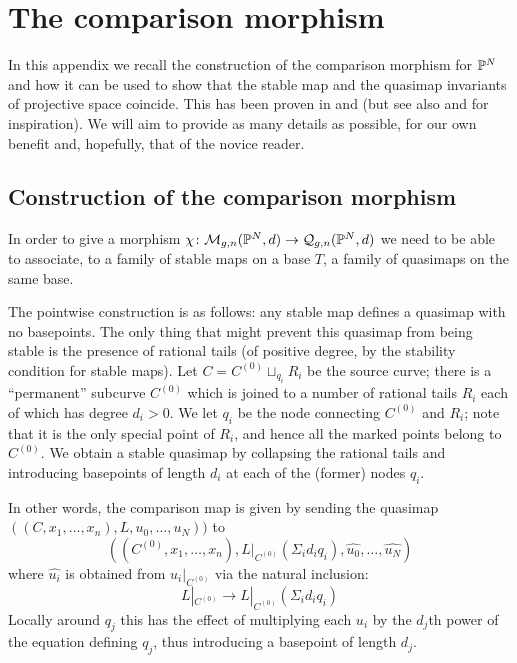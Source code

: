 \section{The comparison morphism} \label{Section comparison morphism}
In this appendix we recall the construction of the comparison morphism for $\mathbb P^N$ and how it can be used to show that the stable map and the quasimap invariants of projective space coincide. This has been proven in \cite[Theorem 3]{MOP} and \cite[Section 4.3]{Manolache-Push} (but see also \cite[Proposition 4.1]{Bertram} and \cite[Theorem 7.1]{Popa-Roth} for inspiration). We will aim to provide as many details as possible, for our own benefit and, hopefully, that of the novice reader.

\subsection{Construction of the comparison morphism}
In order to give a morphism $\chi\colon\mathcal{M}_{g,n}(\mathbb P^N,d)\rightarrow\mathcal{Q}_{g,n}(\mathbb P^N,d)$ we need to be able to associate, to a family of stable maps on a base $T$, a family of quasimaps on the same base.

The pointwise construction is as follows: any stable map defines a quasimap with no basepoints. The only thing that might prevent this quasimap from being stable is the presence of rational tails (of positive degree, by the stability condition for stable maps). Let $C=C^{(0)}\sqcup_{q_i}R_i$ be the source curve; there is a ``permanent'' subcurve $C^{(0)}$ which is joined to a number of rational tails $R_i$ each of which has degree $d_i>0$. We let $q_i$ be the node connecting $C^{(0)}$ and $R_i$; note that it is the only special point of $R_i$, and hence all the marked points belong to $C^{(0)}$. We obtain a stable quasimap by collapsing the rational tails and introducing basepoints of length $d_i$ at each of the (former) nodes $q_i$.

In other words, the comparison map is given by sending the quasimap $((C,x_1,\ldots,x_n),L,u_0,\ldots,u_N))$ to 
\begin{equation*}((C^{(0)},x_1,\ldots,x_n),L|_{C^{(0)}}(\Sigma_i d_i q_i),\hat{u_0},\ldots,\hat{u_N}) \end{equation*}
where $\hat{u_i}$ is obtained from $u_i|_{C^{(0)}}$ via the natural inclusion:
\begin{equation*} L|_{C^{(0)}}\to L|_{C^{(0)}}(\Sigma_i d_i q_i) \end{equation*}
Locally around $q_j$ this has the effect of multiplying each $u_i$ by the $d_j$th power of the equation defining $q_j$, thus introducing a basepoint of length $d_j$.

